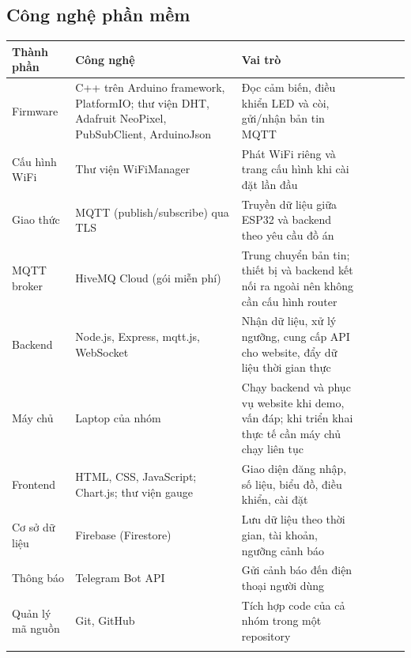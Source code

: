 \documentclass[12pt,a4paper]{article}
\newcommand{\outerline}{\Xhline{0.9pt}}
\begin{document}
\noindent\begin{minipage}{\linewidth}
\setlength{\parskip}{6pt}
\subsection{Công nghệ phần mềm}
\begin{tabularx}{\linewidth}{I L{2.6cm} i L{5.0cm} i Y I}
\outerline
\textbf{Thành phần} & \textbf{Công nghệ} & \textbf{Vai trò} \\
\hline
Firmware & C++ trên Arduino framework, PlatformIO; thư viện DHT, Adafruit NeoPixel, PubSubClient, ArduinoJson & Đọc cảm biến, điều khiển LED và còi, gửi/nhận bản tin MQTT \\
\hline
Cấu hình WiFi & Thư viện WiFiManager & Phát WiFi riêng và trang cấu hình khi cài đặt lần đầu \\
\hline
Giao thức & MQTT (publish/subscribe) qua TLS & Truyền dữ liệu giữa ESP32 và backend theo yêu cầu đồ án \\
\hline
MQTT broker & HiveMQ Cloud (gói miễn phí) & Trung chuyển bản tin; thiết bị và backend kết nối ra ngoài nên không cần cấu hình router \\
\hline
Backend & Node.js, Express, mqtt.js, WebSocket & Nhận dữ liệu, xử lý ngưỡng, cung cấp API cho website, đẩy dữ liệu thời gian thực \\
\hline
Máy chủ & Laptop của nhóm & Chạy backend và phục vụ website khi demo, vấn đáp; khi triển khai thực tế cần máy chủ chạy liên tục \\
\hline
Frontend & HTML, CSS, JavaScript; Chart.js; thư viện gauge & Giao diện đăng nhập, số liệu, biểu đồ, điều khiển, cài đặt \\
\hline
Cơ sở dữ liệu & Firebase (Firestore) & Lưu dữ liệu theo thời gian, tài khoản, ngưỡng cảnh báo \\
\hline
Thông báo & Telegram Bot API & Gửi cảnh báo đến điện thoại người dùng \\
\hline
Quản lý mã nguồn & Git, GitHub & Tích hợp code của cả nhóm trong một repository \\
\outerline
\end{tabularx}
\end{minipage}
\par\bigskip
\end{document}
